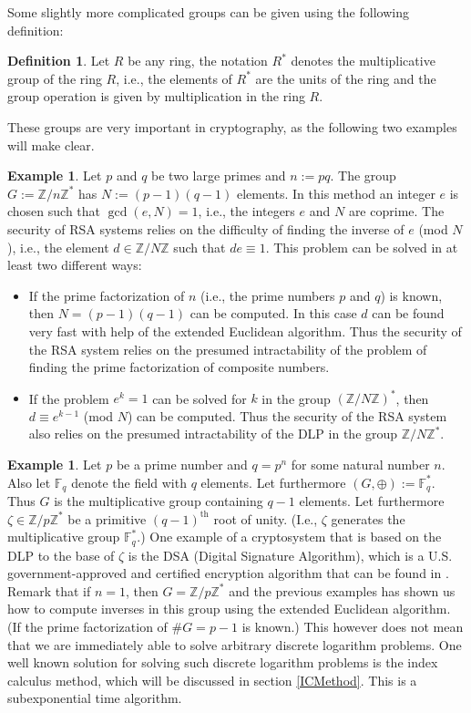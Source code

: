 \documentclass{article}
\numberwithin{equation}{section}
\theoremstyle{definition}
\newtheorem{definition}[theorem]{Definition}
\newtheorem{example}[theorem]{Example}
\newcommand{\ZZ}{{\mathbb Z}} %
\newcommand{\Zmod}[1]{\ZZ / #1\ZZ} %
\newcommand{\FF}[1]{{\mathbb F}_{#1}} %
\begin{document}
Some slightly more complicated groups can be given using the following definition:

\begin{definition}
Let $R$ be any ring, the notation $R^*$ denotes the multiplicative group of the ring $R$, i.e., the elements of $R^*$ are the units of the ring and the group operation is given by multiplication in the ring $R$.
\end{definition}

These groups are very important in cryptography, as the following two examples will make clear. 

\begin{example}\label{RSAintro}
Let $p$ and $q$ be two large primes and $n:=pq$. The group $G:=\Zmod{n}^*$ has $N:=(p-1)(q-1)$ elements. In this method an integer $e$ is chosen such that $\gcd(e,N)=1$, i.e., the integers $e$ and $N$ are coprime. The security of RSA systems relies on the difficulty of finding the inverse of $e$ (mod $N$), i.e., the element $d \in \Zmod{N}$ such that $de \equiv 1$. This problem can be solved in at least two different ways:
\begin{itemize}
\item If the prime factorization of $n$ (i.e., the prime numbers $p$ and $q$) is known, then $N=(p-1)(q-1)$ can be computed. In this case $d$ can be found very fast with help of the extended Euclidean algorithm. Thus the security of the RSA system relies on the presumed intractability of the problem of finding the prime factorization of composite numbers. 
\item If the problem $e^k=1$ can be solved for $k$ in the group $\left(\Zmod{N}\right)^*$, then $d\equiv e^{k-1}$ (mod $N$) can be computed. Thus the security of the RSA system also relies on the presumed intractability of the DLP in the group $\Zmod{N}^*$. 
\end{itemize}
\end{example}

\begin{example}\label{FFqDLP}
Let $p$ be a prime number and $q=p^n$ for some natural number $n$. Also let $\FF{q}$ denote the field with $q$ elements. Let furthermore $(G,\oplus):=\FF{q}^*$. Thus $G$ is the multiplicative group containing $q-1$ elements. Let furthermore $\zeta \in \Zmod{p}^*$ be a primitive $(q-1)^\text{th}$ root of unity. (I.e., $\zeta$ generates the multiplicative group $\FF{q}^*$.) One example of a cryptosystem that is based on the DLP to the base of $\zeta$ is the DSA (Digital Signature Algorithm), which is a U.S. government-approved and certified encryption algorithm that can be found in \cite{DSS}.  Remark that if $n=1$, then $G=\Zmod{p}^*$ and the previous examples has shown us how to compute inverses in this group using the extended Euclidean algorithm. (If the prime factorization of $\#G=p-1$ is known.) This however does not mean that we are immediately able to solve arbitrary discrete logarithm problems. One well known solution for solving such discrete logarithm problems is the index calculus method, which will be discussed in section \ref{ICMethod}. This is a subexponential time algorithm. 
\end{example}
\end{document}
